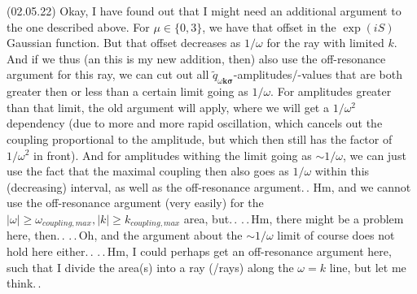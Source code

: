 \documentclass{report}
\begin{document}
(02.05.22) Okay, I have found out that I might need an additional argument to the one described above. For $\mu\in\{0,3\}$, we have that offset in the $\exp(iS)$ Gaussian function. But that offset decreases as $1/\omega$ for the ray with limited $k$. And if we thus (an this is my new addition, then) also use the off-resonance argument for this ray, we can cut out all $\tilde q_{\omega \boldsymbol{k}\boldsymbol{\sigma}}$-amplitudes/-values that are both greater then or less than a certain limit going as $1/\omega$. For amplitudes greater than that limit, the old argument will apply, where we will get a $1/\omega^2$ dependency (due to more and more rapid oscillation, which cancels out the coupling proportional to the amplitude, but which then still has the factor of $1/\omega^2$ in front). And for amplitudes withing the limit going as $\sim 1/\omega$, we can just use the fact that the maximal coupling then also goes as $1/\omega$ within this (decreasing) interval, as well as the off-resonance argument.\,. Hm, and we cannot use the off-resonance argument (very easily) for the $|\omega|\geq\omega_{coupling, max}, |k|\geq k_{coupling, max}$ area, but.\,. .\,.\,Hm, there might be a problem here, then.\,. .\,.\,Oh, and the argument about the $\sim 1/\omega$ limit of course does not hold here either.\,. .\,.\,Hm, I could perhaps get an off-resonance argument here, such that I divide the area(s) into a ray (/rays) along the $\omega = k$ line, but let me think.\,. %
\end{document}
